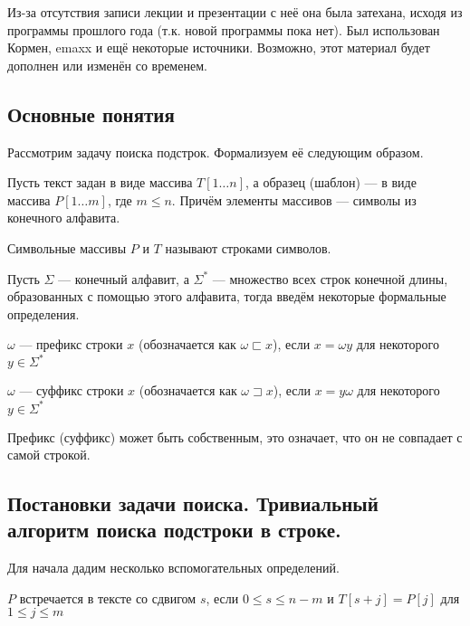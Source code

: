 \begin{tcolorbox}[sharp corners, colback=white, colframe=white!60!black, title=Важно!]
	Из-за отсутствия записи лекции и презентации с неё она была затехана,
	исходя из программы прошлого года (т.к. новой программы пока нет). Был использован Кормен, emaxx и 
	ещё некоторые источники. Возможно, этот материал будет дополнен или изменён со временем.
\end{tcolorbox}


\subsection{Основные понятия}

Рассмотрим задачу поиска подстрок. Формализуем её следующим образом.
\begin{remark}
	Пусть текст задан в виде массива $T[1 \ldots n]$, а образец (шаблон) --- в виде массива
	$P[1 \ldots m]$, где $m \leq n$. Причём элементы массивов --- символы из конечного алфавита. 
\end{remark}

\begin{definition}
	Символьные массивы $P$ и $T$ называют строками символов.
\end{definition}

Пусть $\Sigma$ --- конечный алфавит, а $\Sigma^{*}$ --- множество всех строк конечной длины, образованных
с помощью этого алфавита, тогда введём некоторые формальные определения.

\begin{definition}
	$\omega$ --- префикс строки $x$ (обозначается как $ \omega \sqsubset x$), если $x = \omega y$
	для некоторого $y \in \Sigma^{*}$ 
\end{definition}

\begin{definition}
	$ \omega$ --- суффикс строки $x$ (обозначается как $ \omega \sqsupset x$), если $x = y \omega $
	для некоторого $y \in \Sigma^{*}$ 
\end{definition}

\begin{remark}
	Префикс (суффикс) может быть собственным, это означает, что он не совпадает с самой строкой.
\end{remark}

\subsection{Постановки задачи поиска. Тривиальный алгоритм поиска подстроки в строке.}
Для начала дадим несколько вспомогательных определений.
\begin{definition}
	$P$ встречается в тексте со сдвигом $s$, если $0 \leq s \leq n - m$ и $T[s + j] = P[j]$ 
	 для $1 \leq j \leq m$
\end{definition}

